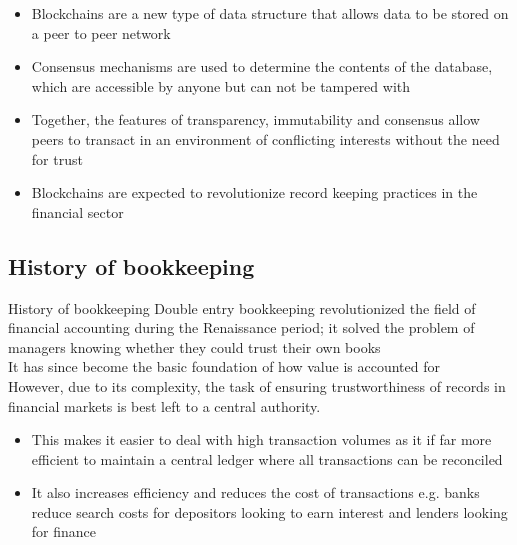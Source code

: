 \documentclass[11pt]{beamer}
\begin{document}
\begin{frame}{}
	\begin{itemize}
		\item Blockchains are a new type of data structure that allows data to be stored on a peer to peer network
		\item Consensus mechanisms are used to determine the contents of the database, which are accessible by anyone but can not be tampered with
		\item Together, the features of transparency, immutability and consensus allow peers to transact in an environment of conflicting interests without the need for trust
		\item Blockchains are expected to revolutionize record keeping practices in the financial sector
	\end{itemize}
\end{frame}

\subsection{History of bookkeeping}

\begin{frame}{History of bookkeeping}
	Double entry bookkeeping revolutionized the field of financial accounting during the Renaissance period; it solved the problem of managers knowing whether they could trust their own books \\ \vspace{3mm}
	It has since become the basic foundation of how value is accounted for\\ \vspace{3mm}
	However, due to its complexity, the task of ensuring trustworthiness of records in financial markets is best left to a central authority.
	\begin{itemize}
		\item This makes it easier to deal with high transaction volumes as it if far more efficient to maintain a central ledger where all transactions can be reconciled
		\item It also increases efficiency and reduces the cost of transactions e.g. banks reduce search costs for depositors looking to earn interest and lenders looking for finance
	\end{itemize}
\end{frame}

\end{document}
